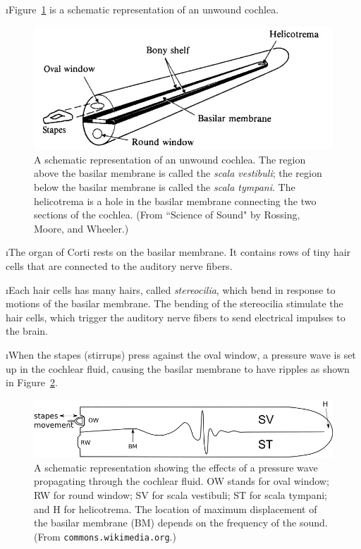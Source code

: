 \i Figure~\ref{f:cochlea-uncoiled} is a schematic
representation of an unwound cochlea.
%
\begin{figure}[htbp]
\begin{center}
\includegraphics[width=.8\textwidth]{cochlea-uncoiled.jpg}
\caption{A schematic representation of an unwound cochlea.
The region above the basilar membrane is called the {\em scala vestibuli};
the region below the basilar membrane is called the {\em scala tympani}.
The helicotrema is a hole in the basilar membrane connecting
the two sections of the cochlea. 
(From ``Science of Sound" by Rossing, Moore, and Wheeler.)}
\label{f:cochlea-uncoiled}
\end{center}
\end{figure}
%

\i The organ of Corti rests on the basilar membrane.
It contains rows of tiny hair cells that are connected to
the auditory nerve fibers.

\i Each hair cells has many hairs, called {\em stereocilia},
which bend in response to motions of the basilar membrane.
The bending of the stereocilia stimulate the hair cells,
which trigger the auditory nerve fibers to send electrical
impulses to the brain.

\i When the stapes (stirrups) press against the oval window,
a pressure wave is set up in the cochlear fluid, causing
the basilar membrane to have ripples as shown in 
Figure~\ref{f:cochlea-uncoiled-schematic}.
%
\begin{figure}[htbp]
\begin{center}
\includegraphics[width=.8\textwidth]{cochlea-uncoiled-schematic.png}
\caption{A schematic representation showing the effects of
a pressure wave propagating through the cochlear fluid.
OW stands for oval window; RW for round window;
SV for scala vestibuli; ST for scala tympani; and
H for helicotrema.
The location of maximum displacement of the basilar membrane
(BM) depends on the frequency of the sound.
(From {\tt commons.wikimedia.org}.)}
\label{f:cochlea-uncoiled-schematic}
\end{center}
\end{figure}
%

